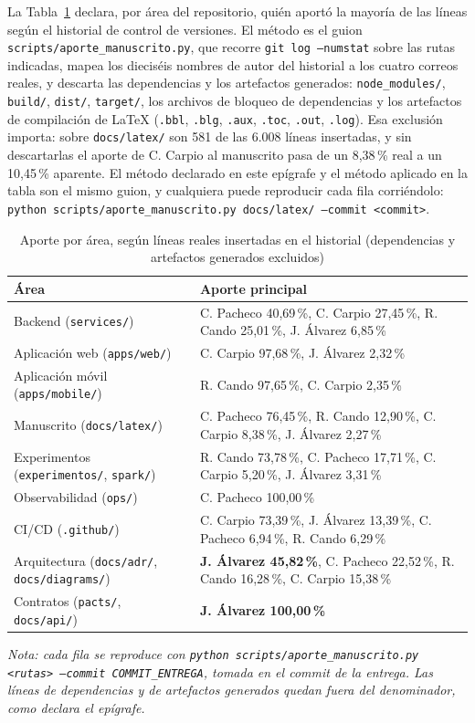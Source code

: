 La Tabla~\ref{tab:aporte-integrantes} declara, por área del repositorio, quién aportó la mayoría
de las líneas según el historial de control de versiones. El método es el guion
\texttt{scripts/aporte\_manuscrito.py}, que recorre \texttt{git log --numstat} sobre las rutas
indicadas, mapea los dieciséis nombres de autor del historial a los cuatro correos reales, y
descarta las dependencias y los artefactos generados: \texttt{node\_modules/}, \texttt{build/},
\texttt{dist/}, \texttt{target/}, los archivos de bloqueo de dependencias y los artefactos de
compilación de \LaTeX{} (\texttt{.bbl}, \texttt{.blg}, \texttt{.aux}, \texttt{.toc},
\texttt{.out}, \texttt{.log}). Esa exclusión importa: sobre \texttt{docs/latex/} son 581 de las
6.008 líneas insertadas, y sin descartarlas el aporte de C. Carpio al manuscrito pasa de un
8,38\,\% real a un 10,45\,\% aparente. El método declarado en este epígrafe y el método aplicado
en la tabla son el mismo guion, y cualquiera puede reproducir cada fila corriéndolo:
\texttt{python scripts/aporte\_manuscrito.py docs/latex/ --commit <commit>}.

\begin{table}[H]
\centering
\caption{Aporte por área, según líneas reales insertadas en el historial (dependencias y
artefactos generados excluidos)}
\label{tab:aporte-integrantes}
\small
\begin{tabular}{@{}p{4.2cm}p{9cm}@{}}
\toprule
\textbf{Área} & \textbf{Aporte principal} \\
\midrule
Backend (\texttt{services/}) & C. Pacheco 40,69\,\%, C. Carpio 27,45\,\%, R. Cando 25,01\,\%, J. Álvarez 6,85\,\% \\
Aplicación web (\texttt{apps/web/}) & C. Carpio 97,68\,\%, J. Álvarez 2,32\,\% \\
Aplicación móvil (\texttt{apps/mobile/}) & R. Cando 97,65\,\%, C. Carpio 2,35\,\% \\
Manuscrito (\texttt{docs/latex/}) & C. Pacheco 76,45\,\%, R. Cando 12,90\,\%, C. Carpio 8,38\,\%, J. Álvarez 2,27\,\% \\
Experimentos (\texttt{experimentos/}, \texttt{spark/}) & R. Cando 73,78\,\%, C. Pacheco 17,71\,\%, C. Carpio 5,20\,\%, J. Álvarez 3,31\,\% \\
Observabilidad (\texttt{ops/}) & C. Pacheco 100,00\,\% \\
CI/CD (\texttt{.github/}) & C. Carpio 73,39\,\%, J. Álvarez 13,39\,\%, C. Pacheco 6,94\,\%, R. Cando 6,29\,\% \\
Arquitectura (\texttt{docs/adr/}, \texttt{docs/diagrams/}) & \textbf{J. Álvarez 45,82\,\%}, C. Pacheco 22,52\,\%, R. Cando 16,28\,\%, C. Carpio 15,38\,\% \\
Contratos (\texttt{pacts/}, \texttt{docs/api/}) & \textbf{J. Álvarez 100,00\,\%} \\
\bottomrule
\end{tabular}

\vspace{2pt}
{\footnotesize\textit{Nota: cada fila se reproduce con
\texttt{python scripts/aporte\_manuscrito.py <rutas> --commit COMMIT\_ENTREGA}, tomada en el
commit de la entrega. Las líneas de dependencias y de artefactos generados quedan fuera del
denominador, como declara el epígrafe.}}
\end{table}

